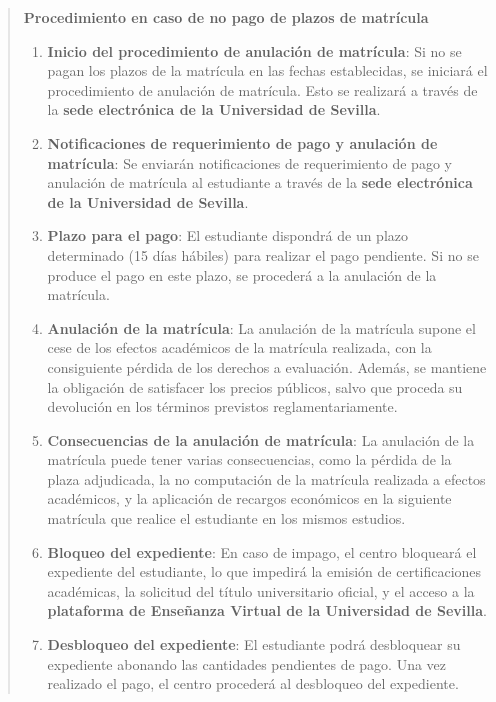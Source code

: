 \documentclass[12pt,a4paper,oneside]{report}
\begin{document}
\begin{itemize}
\begin{itemize}
\begin{quote}
\noindent\textbf{Procedimiento en caso de no pago de plazos de matrícula}\\
\begin{enumerate}
  \item \textbf{Inicio del procedimiento de anulación de matrícula}: Si no se pagan los plazos de la matrícula en las fechas establecidas, se iniciará el procedimiento de anulación de matrícula. Esto se realizará a través de la \textbf{sede electrónica de la Universidad de Sevilla}.
  \item \textbf{Notificaciones de requerimiento de pago y anulación de matrícula}: Se enviarán notificaciones de requerimiento de pago y anulación de matrícula al estudiante a través de la \textbf{sede electrónica de la Universidad de Sevilla}.
  \item \textbf{Plazo para el pago}: El estudiante dispondrá de un plazo determinado (15 días hábiles) para realizar el pago pendiente. Si no se produce el pago en este plazo, se procederá a la anulación de la matrícula.
  \item \textbf{Anulación de la matrícula}: La anulación de la matrícula supone el cese de los efectos académicos de la matrícula realizada, con la consiguiente pérdida de los derechos a evaluación. Además, se mantiene la obligación de satisfacer los precios públicos, salvo que proceda su devolución en los términos previstos reglamentariamente.
  \item \textbf{Consecuencias de la anulación de matrícula}: La anulación de la matrícula puede tener varias consecuencias, como la pérdida de la plaza adjudicada, la no computación de la matrícula realizada a efectos académicos, y la aplicación de recargos económicos en la siguiente matrícula que realice el estudiante en los mismos estudios.
  \item \textbf{Bloqueo del expediente}: En caso de impago, el centro bloqueará el expediente del estudiante, lo que impedirá la emisión de certificaciones académicas, la solicitud del título universitario oficial, y el acceso a la \textbf{plataforma de Enseñanza Virtual de la Universidad de Sevilla}.
  \item \textbf{Desbloqueo del expediente}: El estudiante podrá desbloquear su expediente abonando las cantidades pendientes de pago. Una vez realizado el pago, el centro procederá al desbloqueo del expediente.
\end{enumerate}


\end{quote}
\end{itemize}
\end{itemize}
\end{document}
